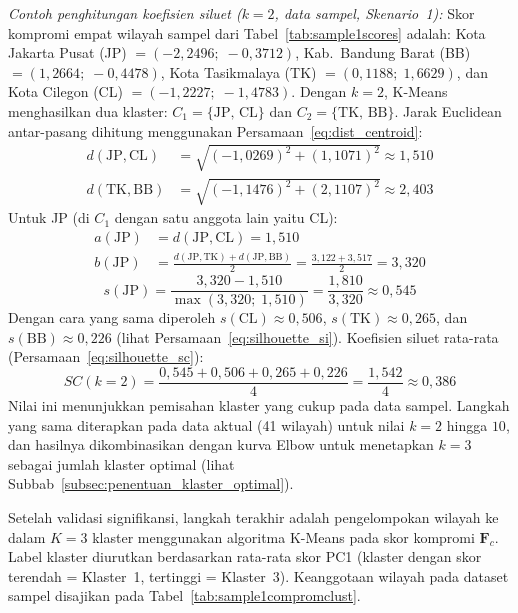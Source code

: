 \label{par:contoh_silhouette}
\noindent\textit{Contoh penghitungan koefisien siluet ($k=2$, data sampel, Skenario~1):} Skor kompromi empat wilayah sampel dari Tabel~\ref{tab:sample1scores} adalah: Kota Jakarta Pusat (JP) $= (-2{,}2496;\;-0{,}3712)$, Kab.\ Bandung Barat (BB) $= (1{,}2664;\;-0{,}4478)$, Kota Tasikmalaya (TK) $= (0{,}1188;\;1{,}6629)$, dan Kota Cilegon (CL) $= (-1{,}2227;\;-1{,}4783)$. Dengan $k=2$, K-Means menghasilkan dua klaster: $C_1 = \{\text{JP},\,\text{CL}\}$ dan $C_2 = \{\text{TK},\,\text{BB}\}$. Jarak Euclidean antar-pasang dihitung menggunakan Persamaan~\ref{eq:dist_centroid}:
\begin{align*}
  d(\text{JP},\text{CL}) &= \sqrt{(-1{,}0269)^2 + (1{,}1071)^2} \approx 1{,}510 \\
  d(\text{TK},\text{BB}) &= \sqrt{(-1{,}1476)^2 + (2{,}1107)^2} \approx 2{,}403
\end{align*}
Untuk JP (di $C_1$ dengan satu anggota lain yaitu CL):
\begin{align*}
  a(\text{JP}) &= d(\text{JP},\text{CL}) = 1{,}510 \\
  b(\text{JP}) &= \frac{d(\text{JP},\text{TK}) + d(\text{JP},\text{BB})}{2} = \frac{3{,}122 + 3{,}517}{2} = 3{,}320
\end{align*}
\[
  s(\text{JP}) = \frac{3{,}320 - 1{,}510}{\max(3{,}320;\;1{,}510)} = \frac{1{,}810}{3{,}320} \approx 0{,}545
\]
Dengan cara yang sama diperoleh $s(\text{CL}) \approx 0{,}506$, $s(\text{TK}) \approx 0{,}265$, dan $s(\text{BB}) \approx 0{,}226$ (lihat Persamaan~\ref{eq:silhouette_si}). Koefisien siluet rata-rata (Persamaan~\ref{eq:silhouette_sc}):
\[
  SC(k=2) = \frac{0{,}545 + 0{,}506 + 0{,}265 + 0{,}226}{4} = \frac{1{,}542}{4} \approx 0{,}386
\]
Nilai ini menunjukkan pemisahan klaster yang cukup pada data sampel. Langkah yang sama diterapkan pada data aktual (41 wilayah) untuk nilai $k = 2$ hingga $10$, dan hasilnya dikombinasikan dengan kurva Elbow untuk menetapkan $k=3$ sebagai jumlah klaster optimal (lihat Subbab~\ref{subsec:penentuan_klaster_optimal}).

Setelah validasi signifikansi, langkah terakhir adalah pengelompokan wilayah ke dalam $K=3$ klaster menggunakan algoritma K-Means pada skor kompromi $\mathbf{F}_c$. Label klaster diurutkan berdasarkan rata-rata skor PC1 (klaster dengan skor terendah = Klaster~1, tertinggi = Klaster~3). Keanggotaan wilayah pada dataset sampel disajikan pada Tabel~\ref{tab:sample1compromclust}.


